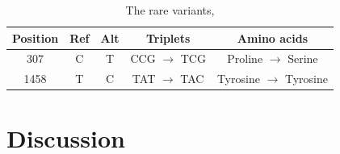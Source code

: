 \documentclass{article}
\begin{document}
\begin{table}
	\centering
	\begin{tabular}{|c|c|c|c|c|}
		\hline
		Position & Ref  & Alt & Triplets & Amino acids\\
		\hline
		307  & C & T & CCG  $\rightarrow$  TCG &  Proline $\rightarrow$ Serine \\
		\hline
		1458  & T & C & TAT $\rightarrow$   TAC &  Tyrosine $\rightarrow$ Tyrosine  \\
	 
		\hline
	\end{tabular}
	\caption{ The rare variants,  }
	\label{tab:rarevars}
\end{table}

\section{Discussion}






 

\end{document}
